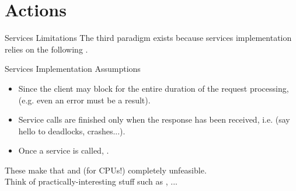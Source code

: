 
\section{Actions}
\graphicspath{{figs/section2/}}

\begin{frame}{Services Limitations}
The third paradigm exists because services implementation relies on the following .
\begin{alertblock}{Services Implementation Assumptions}
  \begin{itemize}
    \item Since the client may block for the entire duration of the request processing,  (e.g. even an error must be a result).
    \item Service calls are finished only when the response has been received, i.e.  (say hello to deadlocks, crashes...).
    \item Once a service is called, .
  \end{itemize}
\end{alertblock}
These make  that  and  (for CPUs!) completely unfeasible.\\
Think of practically-interesting stuff such as , ...
\end{frame}


